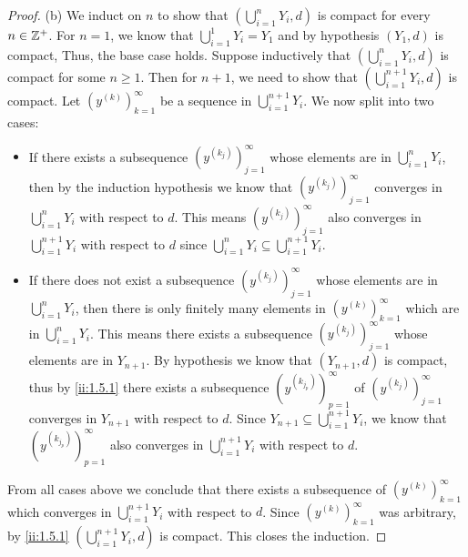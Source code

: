 \begin{proof}{(b)}
  We induct on \(n\) to show that \((\bigcup_{i = 1}^n Y_i, d)\) is compact for every \(n \in \mathbb{Z}^+\).
  For \(n = 1\), we know that \(\bigcup_{i = 1}^1 Y_i = Y_1\) and by hypothesis \((Y_1, d)\) is compact, Thus, the base case holds.
  Suppose inductively that \((\bigcup_{i = 1}^n Y_i, d)\) is compact for some \(n \geq 1\).
  Then for \(n + 1\), we need to show that \((\bigcup_{i = 1}^{n + 1} Y_i, d)\) is compact.
  Let \((y^{(k)})_{k = 1}^\infty\) be a sequence in \(\bigcup_{i = 1}^{n + 1} Y_i\).
  We now split into two cases:
  \begin{itemize}
    \item If there exists a subsequence \((y^{(k_j)})_{j = 1}^\infty\) whose elements are in \(\bigcup_{i = 1}^n Y_i\), then by the induction hypothesis we know that \((y^{(k_j)})_{j = 1}^\infty\) converges in \(\bigcup_{i = 1}^n Y_i\) with respect to \(d\).
          This means \((y^{(k_j)})_{j = 1}^\infty\) also converges in \(\bigcup_{i = 1}^{n + 1} Y_i\) with respect to \(d\) since \(\bigcup_{i = 1}^n Y_i \subseteq \bigcup_{i = 1}^{n + 1} Y_i\).
    \item If there does not exist a subsequence \((y^{(k_j)})_{j = 1}^\infty\) whose elements are in \(\bigcup_{i = 1}^n Y_i\), then there is only finitely many elements in \((y^{(k)})_{k = 1}^\infty\) which are in \(\bigcup_{i = 1}^n Y_i\).
          This means there exists a subsequence \((y^{(k_j)})_{j = 1}^\infty\) whose elements are in \(Y_{n + 1}\).
          By hypothesis we know that \((Y_{n + 1}, d)\) is compact, thus by \cref{ii:1.5.1} there exists a subsequence \((y^{(k_{j_p})})_{p = 1}^\infty\) of \((y^{(k_j)})_{j = 1}^\infty\) converges in \(Y_{n + 1}\) with respect to \(d\).
          Since \(Y_{n + 1} \subseteq \bigcup_{i = 1}^{n + 1} Y_i\), we know that \((y^{(k_{j_p})})_{p = 1}^\infty\) also converges in \(\bigcup_{i = 1}^{n + 1} Y_i\) with respect to \(d\).
  \end{itemize}
  From all cases above we conclude that there exists a subsequence of \((y^{(k)})_{k = 1}^\infty\) which converges in \(\bigcup_{i = 1}^{n + 1} Y_i\) with respect to \(d\).
  Since \((y^{(k)})_{k = 1}^\infty\) was arbitrary, by \cref{ii:1.5.1} \((\bigcup_{i = 1}^{n + 1} Y_i, d)\) is compact.
  This closes the induction.
\end{proof}

